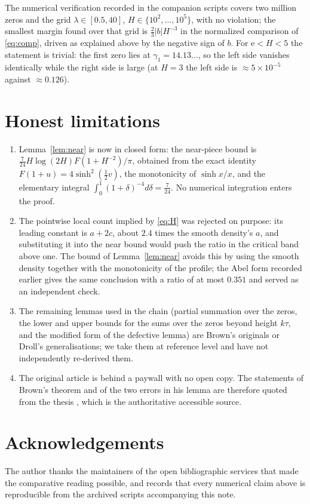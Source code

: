 \documentclass[11pt]{article}
\theoremstyle{definition}
\newcommand{\e}{\mathrm{e}}
\begin{document}
The numerical verification recorded in the companion scripts covers two million zeros and the grid
$\lambda\in[0.5,40]$, $H\in\{10^{2},\dots,10^{5}\}$, with no violation; the smallest margin found over
that grid is $\tfrac23|b|H^{-3}$ in the normalized comparison of \eqref{eq:comp}, driven as explained
above by the negative sign of $b$. For $\e<H<5$ the statement is trivial: the first zero lies at
$\gamma_1=14.13\ldots$, so the left side vanishes identically while the right side is large (at $H=3$
the left side is $\approx5\times10^{-5}$ against $\approx0.126$).

\section{Honest limitations}\label{sec:limits}
\begin{enumerate}
\item Lemma~\ref{lem:near} is now in closed form: the near-piece bound is
$\tfrac7{24}H\log(2H)F(1+H^{-2})/\pi$, obtained from the exact identity
$F(1+u)=4\sinh^{2}(\tfrac12v)$, the monotonicity of $\sinh x/x$, and the elementary integral
$\int_0^{1}(1+\delta)^{-4}d\delta=\tfrac7{24}$. No numerical integration enters the proof.
\item The pointwise local count implied by \eqref{eq:H} was rejected on purpose: its leading constant is
$a+2c$, about $2.4$ times the smooth density's $a$, and substituting it into the near bound would push
the ratio in the critical band above one. The bound of Lemma~\ref{lem:near} avoids this by using the
smooth density together with the monotonicity of the profile; the Abel form recorded earlier gives the
same conclusion with a ratio of at most $0.351$ and served as an independent check.
\item The remaining lemmas used in the chain (partial summation over the zeros, the lower and upper
bounds for the sums over the zeros beyond height $k\tau$, and the modified form of the defective lemma)
are Brown's originals or Droll's generalisations; we take them at reference level and have not
independently re-derived them.
\item The original article \cite{Br05} is behind a paywall with no open copy. The statements of Brown's
theorem and of the two errors in his lemma are therefore quoted from the thesis \cite{Dr12}, which is
the authoritative accessible source.
\end{enumerate}

\section*{Acknowledgements}
The author thanks the maintainers of the open bibliographic services that made the comparative reading
possible, and records that every numerical claim above is reproducible from the archived scripts
accompanying this note.
\end{document}
